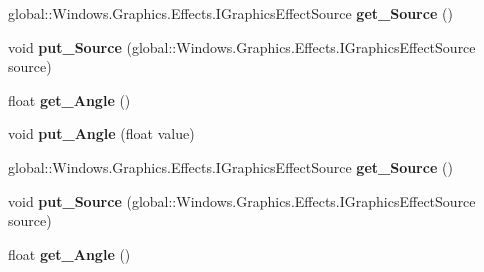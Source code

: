 \begin{DoxyCompactItemize}
global\+::\+Windows.\+Graphics.\+Effects.\+I\+Graphics\+Effect\+Source {\bfseries get\+\_\+\+Source} ()
\item 
\mbox{\label{interface_microsoft_1_1_graphics_1_1_canvas_1_1_effects_1_1_i_hue_rotation_effect_add1d03b98525daf7cf8bd4e598fbd195}} 
void {\bfseries put\+\_\+\+Source} (global\+::\+Windows.\+Graphics.\+Effects.\+I\+Graphics\+Effect\+Source source)
\item 
\mbox{\label{interface_microsoft_1_1_graphics_1_1_canvas_1_1_effects_1_1_i_hue_rotation_effect_a7e1cc248274b2ef58fdb4796ecf993a2}} 
float {\bfseries get\+\_\+\+Angle} ()
\item 
\mbox{\label{interface_microsoft_1_1_graphics_1_1_canvas_1_1_effects_1_1_i_hue_rotation_effect_ae26bc54153b6d6e0b9c9981d3097859a}} 
void {\bfseries put\+\_\+\+Angle} (float value)
\item 
\mbox{\label{interface_microsoft_1_1_graphics_1_1_canvas_1_1_effects_1_1_i_hue_rotation_effect_a985c537972d6f1c44f2004ddbc228e45}} 
global\+::\+Windows.\+Graphics.\+Effects.\+I\+Graphics\+Effect\+Source {\bfseries get\+\_\+\+Source} ()
\item 
\mbox{\label{interface_microsoft_1_1_graphics_1_1_canvas_1_1_effects_1_1_i_hue_rotation_effect_add1d03b98525daf7cf8bd4e598fbd195}} 
void {\bfseries put\+\_\+\+Source} (global\+::\+Windows.\+Graphics.\+Effects.\+I\+Graphics\+Effect\+Source source)
\item 
\mbox{\label{interface_microsoft_1_1_graphics_1_1_canvas_1_1_effects_1_1_i_hue_rotation_effect_a7e1cc248274b2ef58fdb4796ecf993a2}} 
float {\bfseries get\+\_\+\+Angle} ()
\item 
\mbox{\label{interface_microsoft_1_1_graphics_1_1_canvas_1_1_effects_1_1_i_hue_rotation_effect_ae26bc54153b6d6e0b9c9981d3097859a}} 

\end{DoxyCompactItemize}
